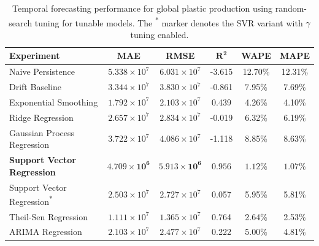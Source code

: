 \begin{table}[!ht]
	\centering
	\caption{\centering Temporal forecasting performance for global plastic production using random-search tuning for tunable models. The \textsuperscript{*} marker denotes the SVR variant with \(\gamma\) tuning enabled.}
	\begin{tabular}{@{}lccccc@{}}
		\toprule
		\textbf{Experiment}                          & \textbf{MAE}                   & \textbf{RMSE}                  & $\mathbf{R^2}$     & \textbf{WAPE}       & \textbf{MAPE}       \\
		\midrule
		Naive Persistence                            & \(5.338 \times 10^7\)          & \(6.031 \times 10^7\)          & -3.615             & 12.70\%             & 12.31\%             \\
		Drift Baseline                               & \(3.344 \times 10^7\)          & \(3.830 \times 10^7\)          & -0.861             & 7.95\%              & 7.69\%              \\
		Exponential Smoothing                        & \(1.792 \times 10^7\)          & \(2.103 \times 10^7\)          & 0.439              & 4.26\%              & 4.10\%              \\
		Ridge Regression                             & \(2.657 \times 10^7\)          & \(2.834 \times 10^7\)          & -0.019             & 6.32\%              & 6.19\%              \\
		Gaussian Process Regression                  & \(3.722 \times 10^7\)          & \(4.086 \times 10^7\)          & -1.118             & 8.85\%              & 8.63\%              \\
		\textbf{Support Vector Regression}           & \(\mathbf{4.709 \times 10^6}\) & \(\mathbf{5.913 \times 10^6}\) & \(\mathbf{0.956}\) & \(\mathbf{1.12}\)\% & \(\mathbf{1.07}\)\% \\
		Support Vector Regression\textsuperscript{*} & \(2.503 \times 10^7\)          & \(2.727 \times 10^7\)          & 0.057              & 5.95\%              & 5.81\%              \\
		Theil-Sen Regression                         & \(1.111 \times 10^7\)          & \(1.365 \times 10^7\)          & 0.764              & 2.64\%              & 2.53\%              \\
		ARIMA Regression                             & \(2.103 \times 10^7\)          & \(2.477 \times 10^7\)          & 0.222              & 5.00\%              & 4.81\%              \\
		\hline
	\end{tabular}
	\label{tab:global_forecasting_random_search_metric_table}
\end{table}

